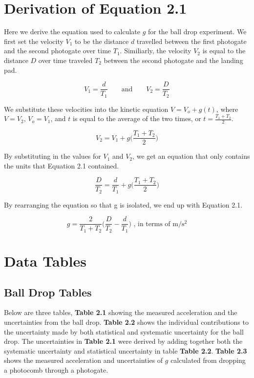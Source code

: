 \documentclass[11pt]{report}
\begin{document}
\newpage
\section*{Derivation of Equation 2.1}

Here we derive the equation used to calculate \(g\) for the ball drop
experiment. We first set the velocity \(V_1\) to be the distance \(d\) travelled between 
the first photogate and the second photogate over time \(T_1\).
Similiarly, the velocity \(V_2\) is equal to the distance \(D\) over time 
traveled \(T_2\) between the second photogate and the landing pad.

\[ V_1 = \frac{d}{T_1}   \qquad\text{and}\qquad     V_2 = \frac{D}{T_2} \]

We substitute these velocities into the kinetic equation \(V = V_o + g(t) \),
where \(V = V_2\), \(V_o = V_1\), and \(t\) is equal to the average of the two
times, or \(t = \frac{T_1 + T_2}{2} \).

\[ V_2 = V_1 + g\Bigg(\frac{T_1 + T_2}{2}\Bigg) \]

By substituting in the values for \(V_1\) and \(V_2\), we get an equation that
only contains the units that Equation 2.1 contained.

\[ \frac{D}{T_2} = \frac{d}{T_1} + g\Bigg(\frac{T_1 + T_2}{2}\Bigg) \]

By rearranging the equation so that g is isolated, we end up with Equation 2.1.

\[ g = \frac{2}{T_1 + T_2}\Bigg(\frac{D}{T_2} - \frac{d}{T_1}\Bigg) \textrm{ , in
terms of m/s$^2$}\]

\section*{Data Tables}
\subsection*{Ball Drop Tables}
Below are three tables, \textbf{Table 2.1} showing the measured acceleration and the
uncertainties from the ball drop.  \textbf{Table 2.2} shows the individual contributions
to the uncertainty made by both statistical and systematic uncertainty for the
ball drop. The uncertainties in \textbf{Table 2.1} were derived by adding together both the
systematic uncertainty and statistical uncertainty in table \textbf{Table 2.2}. 
\textbf{Table 2.3} shows the measured acceleration and uncertainties of \(g\) 
calculated from dropping a photocomb through a photogate.  
\end{document}
